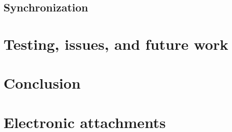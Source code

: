 \documentclass[
  digital,     %
  color,       %
  oneside,     %
  nosansbold,  %
  nocolorbold, %
  lof,         %
  lot,         %
]{fithesis4}
\begin{document}
\section{Synchronization}

\chapter{Testing, issues, and future work}

\chapter*{Conclusion}

\setcounter{biburllcpenalty}{7000}
\setcounter{biburlucpenalty}{8000}
\printbibliography[heading=bibintoc] %

\appendix %
\chapter{Electronic attachments}
\end{document}
